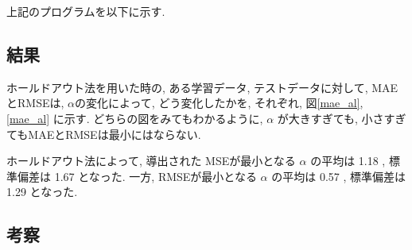 \documentclass{jsarticle}
\begin{document}
上記のプログラムを以下に示す. 

\subsection{結果}
ホールドアウト法を用いた時の, ある学習データ, テストデータに対して, MAEとRMSEは, $\alpha$の変化によって, どう変化したかを, それぞれ, 図\ref{mae_al}, \ref{mae_al} に示す.
どちらの図をみてもわかるように, $\alpha$ が大きすぎても, 小さすぎてもMAEとRMSEは最小にはならない. 

ホールドアウト法によって, 導出された MSEが最小となる $\alpha$ の平均は 1.18 , 
標準偏差は 1.67 となった.
一方, RMSEが最小となる $\alpha$ の平均は 0.57 , 標準偏差は 1.29 となった. 


\subsection{考察}
\end{document}
